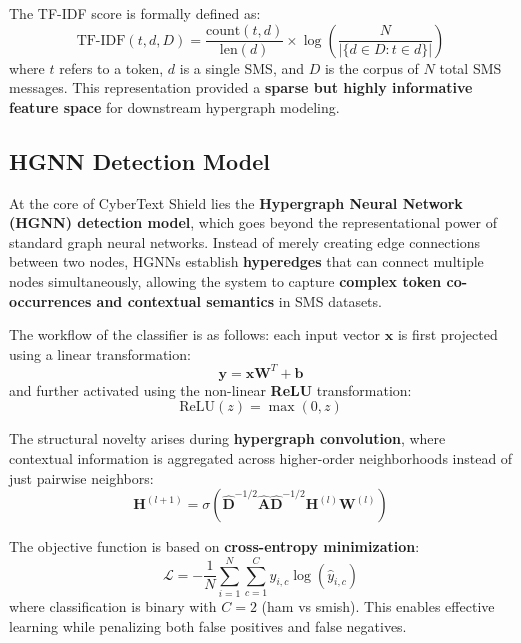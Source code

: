 \documentclass[conference]{IEEEtran}
\begin{document}
The TF-IDF score is formally defined as:  
\begin{equation}
\text{TF-IDF}(t, d, D) = \frac{\text{count}(t,d)}{\text{len}(d)} \times \log \left( \frac{N}{|\{d \in D : t \in d\}|} \right)
\end{equation}  
where \(t\) refers to a token, \(d\) is a single SMS, and \(D\) is the corpus of \(N\) total SMS messages. This representation provided a \textbf{sparse but highly informative feature space} for downstream hypergraph modeling.  

\subsection{ HGNN Detection Model}  
At the core of CyberText Shield lies the \textbf{Hypergraph Neural Network (HGNN) detection model}, which goes beyond the representational power of standard graph neural networks. Instead of merely creating edge connections between two nodes, HGNNs establish \textbf{hyperedges} that can connect multiple nodes simultaneously, allowing the system to capture \textbf{complex token co-occurrences and contextual semantics} in SMS datasets.  

The workflow of the classifier is as follows: each input vector $\mathbf{x}$ is first projected using a linear transformation:  
\begin{equation}
\mathbf{y} = \mathbf{x}\mathbf{W}^T + \mathbf{b}
\end{equation}  
and further activated using the non-linear \textbf{ReLU} transformation:  
\begin{equation}
\text{ReLU}(z) = \max(0, z)
\end{equation}  

The structural novelty arises during \textbf{hypergraph convolution}, where contextual information is aggregated across higher-order neighborhoods instead of just pairwise neighbors:  
\begin{equation}
\mathbf{H}^{(l+1)} = \sigma \left( \hat{\mathbf{D}}^{-1/2}\hat{\mathbf{A}}\hat{\mathbf{D}}^{-1/2}\mathbf{H}^{(l)}\mathbf{W}^{(l)} \right)
\end{equation}  

The objective function is based on \textbf{cross-entropy minimization}:  
\begin{equation}
\mathcal{L} = -\frac{1}{N} \sum_{i=1}^N \sum_{c=1}^C y_{i,c}\log(\hat{y}_{i,c})
\end{equation}  
where classification is binary with \(C=2\) (ham vs smish). This enables effective learning while penalizing both false positives and false negatives.  
\end{document}
